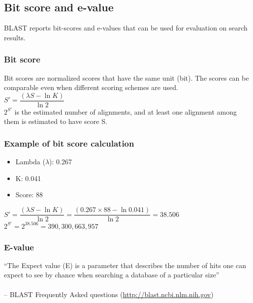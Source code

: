 %
%

%
%
\subsection{Bit score and e-value}
BLAST reports bit-scores and e-values that can be used for evaluation on search results.

%
%
\subsubsection*{Bit score} 
Bit scores are normalized scores that have the same unit (bit). The scores can be comparable even when different scoring schemes are used. \\

$S' = \dfrac{(\lambda S - \ln K)}{\ln⁡ 2}$ \\

\noindent
$2^{S'}$ is the estimated number of alignments, and at least one alignment among them is estimated to have score S.

%
%
\subsubsection*{Example of bit score calculation} 
\begin{itemize}
\item Lambda ($\lambda$): 0.267
\item K: 0.041
\item Score: 88
\end{itemize}

$S' = \dfrac{(\lambda S - \ln⁡ K)}{\ln⁡ 2} = \dfrac{(0.267 \times 88 -  \ln⁡ 0.041)}{\ln⁡ 2} = 38.506$\\

$2^{S'} = 2^{38.506} = 390,300,663,957$

%
%
\subsubsection*{E-value} 
``The Expect value (E) is a parameter that describes the number of hits one can expect to see by chance when searching a database of a particular size'' \\ \\
-- BLAST Frequently Asked questions (\href{http://blast.ncbi.nlm.nih.gov}{http://blast.ncbi.nlm.nih.gov}) \\

